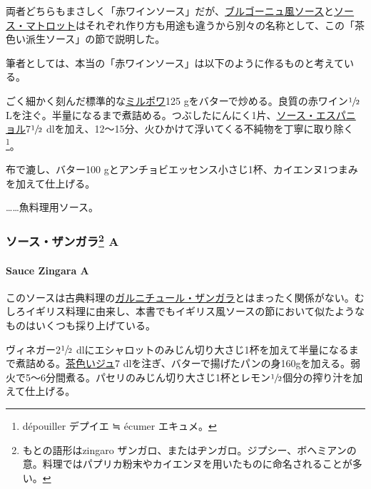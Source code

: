 両者どちらもまさしく「赤ワインソース」だが、\protect\hyperlink{sauce-bourguignonne}{ブルゴーニュ風ソース}と\protect\hyperlink{sauce-matelote}{ソース・マトロット}はそれぞれ作り方も用途も違うから別々の名称として、この「茶色い派生ソース」の節で説明した。

筆者としては、本当の「赤ワインソース」は以下のように作るものと考えている。

ごく細かく刻んだ標準的な\protect\hyperlink{mirepoix}{ミルポワ}125
gをバターで炒める。良質の赤ワイン\(\sfrac{1}{2}\)
Lを注ぐ。半量になるまで煮詰める。つぶしたにんにく1片、\protect\hyperlink{sauce-espagnole}{ソース・エスパニョル}7\(\sfrac{1}{2}\)
dlを加え、12〜15分、火ひかけて浮いてくる不純物を丁寧に取り除く\footnote{dépouiller
  デプイエ ≒ écumer エキュメ。}。

布で漉し、バター100
gとアンチョビエッセンス小さじ1杯、カイエンヌ1つまみを加えて仕上げる。

\ldots{}\ldots{}魚料理用ソース。

\maeaki

\hypertarget{ux30bdux30fcux30b9ux30b6ux30f3ux30acux30e997-a}{%
\subsubsection[ソース・ザンガラ
A]{\texorpdfstring{ソース・ザンガラ\footnote{もとの語形はzingaro
  ザンガロ、またはヂンガロ。ジプシー、ボヘミアンの意。料理ではパプリカ粉末やカイエンヌを用いたものに命名されることが多い。}
A}{ソース・ザンガラ A}}\label{ux30bdux30fcux30b9ux30b6ux30f3ux30acux30e997-a}}

\hypertarget{sauce-zingara-a}{%
\paragraph{Sauce Zingara A}\label{sauce-zingara-a}}


このソースは古典料理の\href{}{ガルニチュール・ザンガラ}とはまったく関係がない。むしろイギリス料理に由来し、本書でもイギリス風ソースの節において似たようなものはいくつも採り上げている。

ヴィネガー2\(\sfrac{1}{2}\)
dlにエシャロットのみじん切り大さじ1杯を加えて半量になるまで煮詰める。\protect\hyperlink{jus-de-veau-lie}{茶色いジュ}7
dlを注ぎ、バターで揚げたパンの身160gを加える。弱火で5〜6分間煮る。パセリのみじん切り大さじ1杯とレモン\(\sfrac{1}{2}\)個分の搾り汁を加えて仕上げる。

